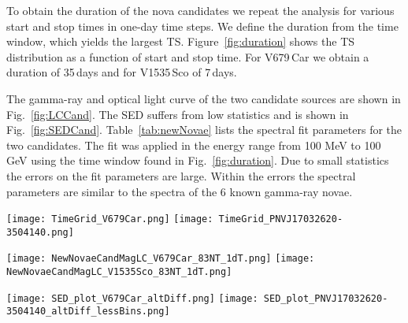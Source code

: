 \documentclass{aa} %
\begin{document}
To obtain the duration of the nova candidates we repeat the analysis for various start and stop times in one-day time steps. We define the duration from the time window, which yields the largest TS. Figure~\ref{fig:duration} shows the TS distribution as a function of start and stop time. For V679\,Car we obtain a duration of 35\,days and for V1535\,Sco of 7\,days.

The gamma-ray and optical light curve of the two candidate sources are shown in Fig.~\ref{fig:LCCand}. The SED suffers from low statistics and is shown in Fig.~\ref{fig:SEDCand}. Table~\ref{tab:newNovae} lists the spectral fit parameters for the two candidates. The fit was applied in the energy range from 100 MeV to 100 GeV using the time window found in Fig.~\ref{fig:duration}. Due to small statistics the errors on the fit parameters are large. Within the errors the spectral parameters are similar to the spectra of the 6 known gamma-ray novae.

\begin{figure*}[htb!]
\begin{center}
\texttt{[image: TimeGrid\_V679Car.png]}
\texttt{[image: TimeGrid\_PNVJ17032620-3504140.png]}
\noindent
\caption{\small TS as a function of start and stop time in days relative to the peak time for V679\,Car (left) and V1535\,Sco (right). The maximal TS is marked with a black circle.}
\label{fig:duration}
\end{center}
\end{figure*}

\begin{figure*}[htb!]
\begin{center}
\texttt{[image: NewNovaeCandMagLC\_V679Car\_83NT\_1dT.png]}
\texttt{[image: NewNovaeCandMagLC\_V1535Sco\_83NT\_1dT.png]}
\noindent
\caption{\small Optical (bottom) and gamma-ray (top) light curves of  V679\,Car (left) and V1535\,Sco (right). The gamma-ray data is binned in one-day bins. For days with $TS<4$ we show 95\% upper limits.}
\label{fig:LCCand}
\end{center}
\end{figure*}

\begin{figure*}[htb!]
\begin{center}
\texttt{[image: SED\_plot\_V679Car\_altDiff.png]}
\texttt{[image: SED\_plot\_PNVJ17032620-3504140\_altDiff\_lessBins.png]}
\noindent
\caption{\small SED for V679\,Car (left) and V1535\,Sco (right) using the duration obtained from Fig.~\ref{fig:duration}. Both SEDs suffer from small statistics. The SED points derived with the standard Galactic diffuse model are shown as black crosses and a power-law with exponential cutoff fit to that data is shown in blue. For V1535\,Sco the energy cutoff is not well constrained by the fit and we thus present the results of a simple power-law fit. The systematic uncertainties introduced by modeling of the Galactic diffuse emission are estimated by repeating the analysis with alternative diffuse models. The envelope of the results using the alternative models are shown as grey bands for each energy bin.}
\label{fig:SEDCand}
\end{center}
\end{figure*} 
\end{document}
